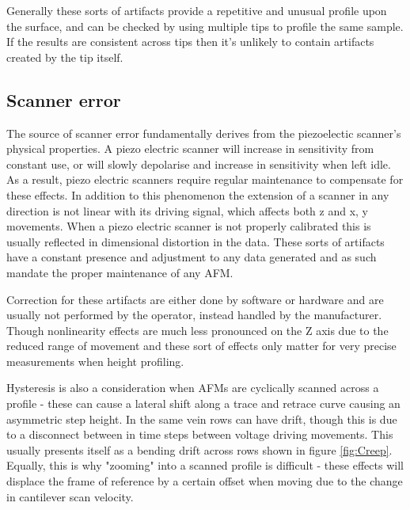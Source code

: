Generally these sorts of artifacts provide a repetitive and unusual profile upon the surface, and can be checked by using multiple tips to profile the same sample. If the results are consistent across tips then it's unlikely to contain artifacts created by the tip itself.

\subsection{Scanner error}

The source of scanner error fundamentally derives from the piezoelectic scanner's physical properties. A piezo electric scanner will increase in sensitivity from constant use, or will slowly depolarise and increase in sensitivity when left idle. As a result, piezo electric scanners require regular maintenance to compensate for these effects. In addition to this phenomenon the extension of a scanner in any direction is not linear with its driving signal, which affects both z and x, y movements. When a piezo electric scanner is not properly calibrated this is usually reflected in dimensional distortion in the data. These sorts of artifacts have a constant presence and adjustment to any data generated and as such mandate the proper maintenance of any AFM. 

Correction for these artifacts are either done by software or hardware and are usually not performed by the operator, instead handled by the manufacturer. Though nonlinearity effects are much less pronounced on the Z axis due to the reduced range of movement and these sort of effects only matter for very precise measurements when height profiling. 

Hysteresis is also a consideration when AFMs are cyclically scanned across a profile - these can cause a lateral shift along a trace and retrace curve causing an asymmetric step height. In the same vein rows can have drift, though this is due to a disconnect between in time steps between voltage driving movements. This usually presents itself as a bending drift across rows shown in figure \ref{fig:Creep}. Equally, this is why "zooming" into a scanned profile is difficult - these effects will displace the frame of reference by a certain offset when moving due to the change in cantilever scan velocity. 

